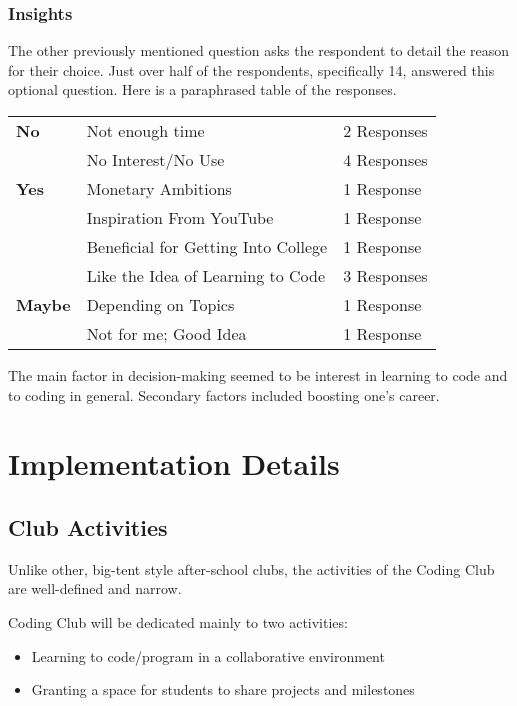 \documentclass{report}
\begin{document}
\subsubsection{Insights}

The other previously mentioned question asks the respondent to detail the reason for their choice. Just over half of the respondents, specifically 14, answered this optional question. Here is a paraphrased table of the responses.\vspace{0.25em}

\begin{center}
	\begin{tabular}{l|l|l}
		\textbf{No}    & Not enough time                     & 2 Responses \\
		               & No Interest/No Use                  & 4 Responses \\ \hline
		\textbf{Yes}   & Monetary Ambitions                  & 1 Response  \\
		               & Inspiration From YouTube            & 1 Response  \\
		               & Beneficial for Getting Into College & 1 Response  \\
		               & Like the Idea of Learning to Code   & 3 Responses \\ \hline
		\textbf{Maybe} & Depending on Topics                 & 1 Response  \\
		               & Not for me; Good Idea               & 1 Response  \\
	\end{tabular}
\end{center}

The main factor in decision-making seemed to be interest in learning to code and to coding in general. Secondary factors included boosting one's career.
\section{Implementation Details}

\subsection{Club Activities}

Unlike other, big-tent style after-school clubs, the activities of the Coding Club are well-defined and narrow.

Coding Club will be dedicated mainly to two activities:
\begin{itemize}
	\item Learning to code/program in a collaborative environment
	\item Granting a space for students to share projects and milestones
\end{itemize}
\end{document}
